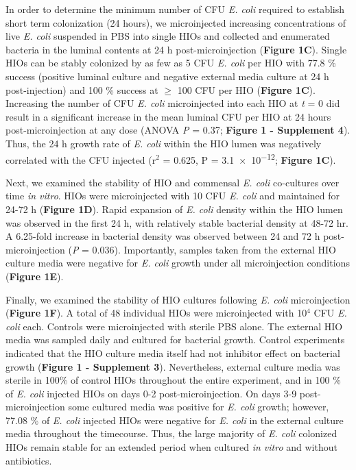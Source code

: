 \documentclass[9pt,lineo]{elife}
\begin{document}
In order to determine the minimum number of CFU \emph{E. coli} required to establish short term colonization (24 hours), we microinjected increasing concentrations of live \emph{E. coli} suspended in PBS into single HIOs and collected and enumerated bacteria in the luminal contents at 24 h post-microinjection (\textbf{Figure 1C}). Single HIOs can be stably colonized by as few as 5 CFU \emph{E. coli} per HIO with 77.8 \% success (positive luminal culture and negative external media culture at 24 h post-injection) and 100 \% success at \(\ge\) 100 CFU per HIO (\textbf{Figure 1C}).  Increasing the number of CFU \emph{E. coli} microinjected into each HIO at \emph{t} = 0 did result in a significant increase in the mean luminal CFU per HIO at 24 hours post-microinjection at any dose (ANOVA \emph{P} = 0.37; \textbf{Figure 1 - Supplement 4}). Thus, the 24 h growth rate of \emph{E. coli} within the HIO lumen was negatively correlated with the CFU injected (r\(^{\text{2}}\) = 0.625, P = \num{3.1e-12}; \textbf{Figure 1C}). 

Next, we examined the stability of HIO and commensal \emph{E. coli} co-cultures over time \emph{in vitro}. HIOs were microinjected with 10 CFU \emph{E. coli} and maintained for 24-72 h (\textbf{Figure 1D}). Rapid expansion of \emph{E. coli} density within the HIO lumen was observed in the first 24 h, with relatively stable bacterial density at 48-72 hr. A 6.25-fold increase in bacterial density was observed between 24 and 72 h post-microinjection (\emph{P} = 0.036). Importantly, samples taken from the external HIO culture media were negative for \emph{E. coli} growth under all microinjection conditions (\textbf{Figure 1E}).

Finally, we examined the stability of HIO cultures following \emph{E. coli} microinjection (\textbf{Figure 1F}). A total of 48 individual HIOs were microinjected with 10\(^{\text{4}}\) CFU \emph{E. coli} each. Controls were microinjected with sterile PBS alone. The external HIO media was sampled daily and cultured for bacterial growth. Control experiments indicated that the HIO culture media itself had not inhibitor effect on bacterial growth (\textbf{Figure 1 - Supplement 3}). Nevertheless, external culture media was sterile in 100\% of control HIOs throughout the entire experiment, and in 100 \% of \emph{E. coli} injected HIOs on days 0-2 post-microinjection. On days 3-9 post-microinjection some cultured media was positive for \emph{E. coli} growth; however, 77.08 \% of \emph{E. coli} injected HIOs were negative for \emph{E. coli} in the external culture media throughout the timecourse. Thus, the large majority of \emph{E. coli} colonized HIOs remain stable for an extended period when cultured \emph{in vitro} and without antibiotics.
\end{document}

